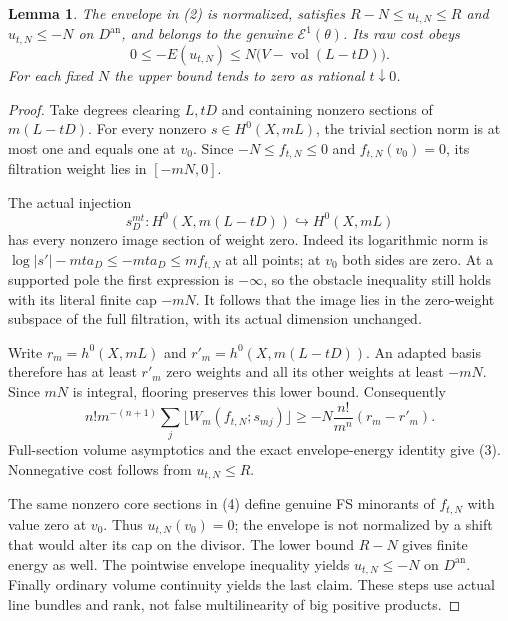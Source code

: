\documentclass[11pt]{article}
\newtheorem{lemma}[theorem]{Lemma}
\newcommand{\Eone}{\mathcal E^1}
\newcommand{\vol}{\operatorname{vol}}
\begin{document}
\begin{lemma}\label{cost}
The envelope in (2) is normalized, satisfies
$R-N\leq u_{t,N}\leq R$ and $u_{t,N}\leq-N$ on $D^{\mathrm{an}}$,
and belongs to the genuine $\Eone(\theta)$. Its raw cost obeys
\[
       0\leq -E(u_{t,N})
            \leq N\bigl(V-\vol(L-tD)\bigr).             \tag{3}
\]
For each fixed $N$ the upper bound tends to zero as rational $t\downarrow0$.
\end{lemma}
\begin{proof}
Take degrees clearing $L,tD$ and containing nonzero sections of
$m(L-tD)$. For every nonzero $s\in H^0(X,mL)$, the trivial section
norm is at most one and equals one at $v_0$. Since $-N\leq f_{t,N}\leq0$
and $f_{t,N}(v_0)=0$, its filtration weight lies in $[-mN,0]$.

The actual injection
\[
 s_D^{mt}:H^0(X,m(L-tD))\hookrightarrow H^0(X,mL)          \tag{4}
\]
has every nonzero image section of weight zero. Indeed its logarithmic
norm is $\log|s'|-mt a_D\leq-mt a_D\leq m f_{t,N}$ at all points;
at $v_0$ both sides are zero. At a supported pole the first expression
is $-\infty$, so the obstacle inequality still holds with its literal
finite cap $-mN$. It follows that the image lies in the zero-weight
subspace of the full filtration, with its actual dimension unchanged.

Write $r_m=h^0(X,mL)$ and $r'_m=h^0(X,m(L-tD))$. An adapted basis
therefore has at least $r'_m$ zero weights and all its other weights
at least $-mN$. Since $mN$ is integral, flooring preserves this lower
bound. Consequently
\[
 n!m^{-(n+1)}\sum_j\lfloor W_m(f_{t,N};s_{mj})\rfloor
          \geq -N\frac{n!}{m^n}(r_m-r'_m).
\]
Full-section volume asymptotics and the exact envelope-energy identity
give (3). Nonnegative cost follows from $u_{t,N}\leq R$.

The same nonzero core sections in (4) define genuine FS minorants of
$f_{t,N}$ with value zero at $v_0$. Thus $u_{t,N}(v_0)=0$;
the envelope is not normalized by a shift that would alter its cap on
the divisor. The lower bound $R-N$ gives finite energy as well.
The pointwise envelope inequality yields $u_{t,N}\leq-N$ on
$D^{\mathrm{an}}$. Finally ordinary volume continuity yields the last
claim. These steps use actual line bundles and rank, not false
multilinearity of big positive products.
\end{proof}
\end{document}
